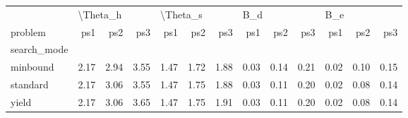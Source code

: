 \begin{tabular}{lrrrrrrrrrrrr}
\toprule
{} & \multicolumn{3}{l}{\textbackslash Theta\_h} & \multicolumn{3}{l}{\textbackslash Theta\_s} & \multicolumn{3}{l}{B\_d} & \multicolumn{3}{l}{B\_e} \\
problem &      ps1 &  ps2 &  ps3 &      ps1 &  ps2 &  ps3 &  ps1 &  ps2 &  ps3 &  ps1 &  ps2 &  ps3 \\
search\_mode &          &      &      &          &      &      &      &      &      &      &      &      \\
\midrule
minbound    &     2.17 & 2.94 & 3.55 &     1.47 & 1.72 & 1.88 & 0.03 & 0.14 & 0.21 & 0.02 & 0.10 & 0.15 \\
standard    &     2.17 & 3.06 & 3.55 &     1.47 & 1.75 & 1.88 & 0.03 & 0.11 & 0.20 & 0.02 & 0.08 & 0.14 \\
yield       &     2.17 & 3.06 & 3.65 &     1.47 & 1.75 & 1.91 & 0.03 & 0.11 & 0.20 & 0.02 & 0.08 & 0.14 \\
\bottomrule
\end{tabular}
